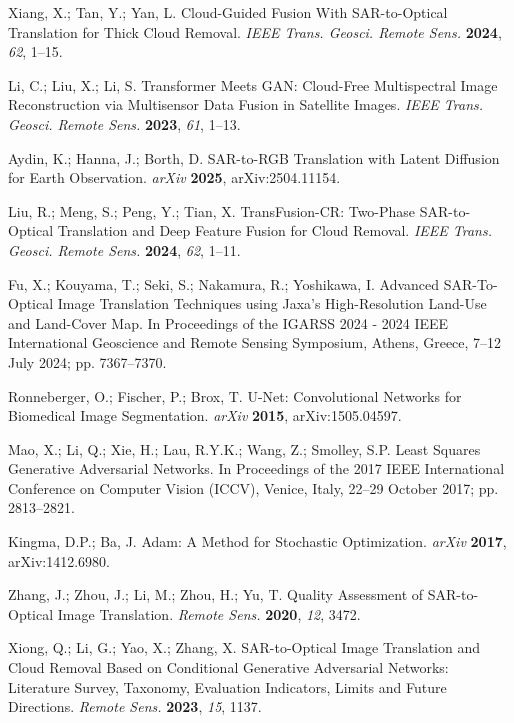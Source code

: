 Xiang, X.; Tan, Y.; Yan, L. Cloud-Guided Fusion With SAR-to-Optical Translation for Thick Cloud Removal. {\em IEEE Trans. Geosci. Remote Sens.} {\bf 2024}, {\em 62}, 1--15.

Li, C.; Liu, X.; Li, S. Transformer Meets GAN: Cloud-Free Multispectral Image Reconstruction via Multisensor Data Fusion in Satellite Images. {\em IEEE Trans. Geosci. Remote Sens.} {\bf 2023}, {\em 61}, 1--13.

Aydin, K.; Hanna, J.; Borth, D. SAR-to-RGB Translation with Latent Diffusion for Earth Observation. {\em arXiv} {\bf 2025}, arXiv:2504.11154.

Liu, R.; Meng, S.; Peng, Y.; Tian, X. TransFusion-CR: Two-Phase SAR-to-Optical Translation and Deep Feature Fusion for Cloud Removal. {\em IEEE Trans. Geosci. Remote Sens.} {\bf 2024}, {\em 62}, 1--11.

Fu, X.; Kouyama, T.; Seki, S.; Nakamura, R.; Yoshikawa, I. Advanced SAR-To-Optical Image Translation Techniques using Jaxa's High-Resolution Land-Use and Land-Cover Map. In Proceedings of the IGARSS 2024 - 2024 IEEE International Geoscience and Remote Sensing Symposium, Athens, Greece, 7–12 July 2024; pp. 7367--7370.

Ronneberger, O.; Fischer, P.; Brox, T. U-Net: Convolutional Networks for Biomedical Image Segmentation. {\em arXiv} {\bf 2015}, arXiv:1505.04597.

Mao, X.; Li, Q.; Xie, H.; Lau, R.Y.K.; Wang, Z.; Smolley, S.P. Least Squares Generative Adversarial Networks. In Proceedings of the 2017 IEEE International Conference on Computer Vision (ICCV), Venice, Italy, 22–29 October 2017; pp. 2813--2821.

Kingma, D.P.; Ba, J. Adam: A Method for Stochastic Optimization. {\em arXiv} {\bf 2017}, arXiv:1412.6980.

Zhang, J.; Zhou, J.; Li, M.; Zhou, H.; Yu, T. Quality Assessment of SAR-to-Optical Image Translation. {\em Remote Sens.} {\bf 2020}, {\em 12}, 3472.

Xiong, Q.; Li, G.; Yao, X.; Zhang, X. SAR-to-Optical Image Translation and Cloud Removal Based on Conditional Generative Adversarial Networks: Literature Survey, Taxonomy, Evaluation Indicators, Limits and Future Directions. {\em Remote Sens.} {\bf 2023}, {\em 15}, 1137.

